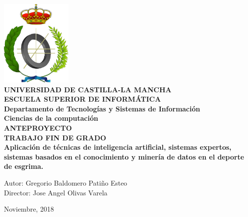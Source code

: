 \documentclass[11pt,a4paper,twoside,final]{article}
\begin{document}




\begin{titlepage}
	\begin{center}
	\includegraphics[width=3.5cm]{escudoInf}\\[1.5cm]
	 
	{\LARGE \textbf{UNIVERSIDAD DE CASTILLA-LA MANCHA \\[0.5em]
	ESCUELA SUPERIOR DE INFORMÁTICA}}\\[0.5cm]
	{\Large \textbf{Departamento de Tecnologías y Sistemas de Información}}\\[0.5cm]
	{\large \textbf{Ciencias de la computación}}\\[1.5cm]
	{\LARGE \textbf{ANTEPROYECTO \\[0.5em]
	TRABAJO FIN DE GRADO}}\\[1cm]
	
	{\LARGE \textbf{Aplicación de técnicas de inteligencia artificial, sistemas expertos, sistemas basados en el conocimiento y minería de datos en el deporte de esgrima.}}\\[3cm]
	\end{center}
	
	\begin{flushleft}
		{\Large Autor: Gregorio Baldomero Patiño Esteo} \\[1em]
		{\Large Director: Jose Angel Olivas Varela} \\[1em]
	\end{flushleft}
	\vfill%
	
	\begin{flushright}
		{\Large Noviembre, 2018}
	\end{flushright}
\end{titlepage}
\end{document}
